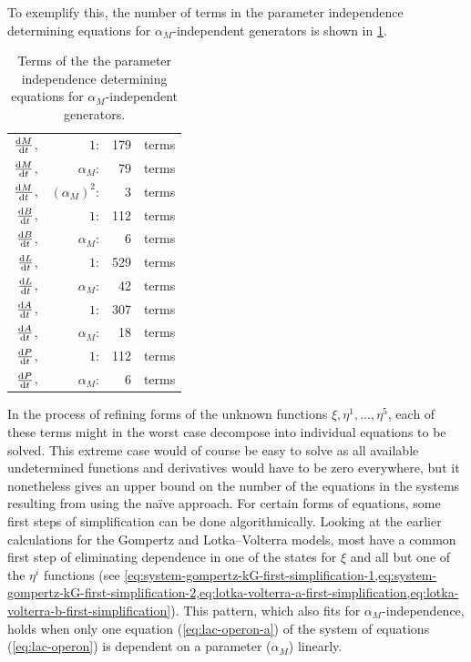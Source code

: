 To exemplify this, the number of terms in the parameter independence determining equations for \(\alpha_M\)-independent generators is shown in \cref{tab:lac-operon-parameter-independence-terms}.
\begin{table}
  \centering
  \begin{tabular}{r@{ }rr@{ }l}
    \(\diff{M}{t}\),& \(1\):& 179& terms \\
    \(\diff{M}{t}\),& \(\alpha_M\):& 79& terms \\
    \(\diff{M}{t}\),& \(\left(\alpha_M\right)^2\):& 3& terms \\
    \(\diff{B}{t}\),& \(1\):& 112& terms \\
    \(\diff{B}{t}\),& \(\alpha_M\):& 6& terms \\
    \(\diff{L}{t}\),& \(1\):& 529& terms \\
    \(\diff{L}{t}\),& \(\alpha_M\):& 42& terms \\
    \(\diff{A}{t}\),& \(1\):& 307& terms \\
    \(\diff{A}{t}\),& \(\alpha_M\):& 18& terms \\
    \(\diff{P}{t}\),& \(1\):& 112& terms \\
    \(\diff{P}{t}\),& \(\alpha_M\):& 6& terms
  \end{tabular}
  \caption{Terms of the the parameter independence determining equations for \(\alpha_M\)-independent generators.}
  \label{tab:lac-operon-parameter-independence-terms}
\end{table}
In the process of refining forms of the unknown functions \(\xi, \eta^1, \dots, \eta^5\), each of these terms might in the worst case decompose into individual equations to be solved.
This extreme case would of course be easy to solve as all available undetermined functions and derivatives would have to be zero everywhere, but it nonetheless gives an upper bound on the number of the equations in the systems resulting from using the naïve approach.
For certain forms of equations, some first steps of simplification can be done algorithmically.
Looking at the earlier calculations for the Gompertz and Lotka--Volterra models, most have a common first step of eliminating dependence in one of the states for \(\xi\) and all but one of the \(\eta^i\) functions (see \cref{eq:system-gompertz-kG-first-simplification-1,eq:system-gompertz-kG-first-simplification-2,eq:lotka-volterra-a-first-simplification,eq:lotka-volterra-b-first-simplification}).
This pattern, which also fits for \(\alpha_M\)-independence, holds when only one equation (\cref{eq:lac-operon-a}) of the system of equations (\cref{eq:lac-operon}) is dependent on a parameter (\(\alpha_M\)) linearly.

